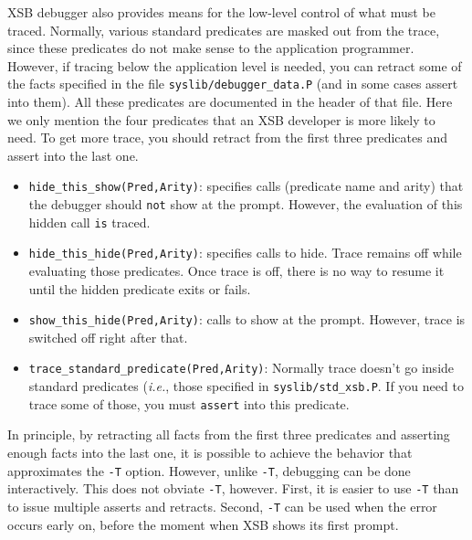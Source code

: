 XSB debugger also provides means for the low-level control of what
must be traced. Normally, various standard predicates are masked out
from the trace, since these predicates do not make sense to the
application programmer.  However, if tracing below the application
level is needed, you can retract some of the facts specified in the
file {\tt syslib/debugger\_data.P} (and in some cases assert into
them). All these predicates are documented in the header of that
file. Here we only mention the four predicates that an XSB developer
is more likely to need. To get more trace, you should retract from the
first three predicates and assert into the last one.
\begin{itemize}
\item {\tt hide\_this\_show(Pred,Arity)}: specifies calls (predicate name and
  arity) that the debugger should {\tt not} show at the prompt. However,
  the evaluation of this hidden call {\tt is} traced.
\item {\tt hide\_this\_hide(Pred,Arity)}: specifies calls to hide. Trace
  remains off while evaluating those predicates. Once trace is off, there
  is no way to resume it until the hidden predicate exits or fails.
\item  {\tt show\_this\_hide(Pred,Arity)}: calls to show at the
  prompt. However, trace is switched off right after that.
\item  {\tt trace\_standard\_predicate(Pred,Arity)}: Normally trace doesn't
  go inside standard predicates ({\it i.e.}, those specified in
  {\tt syslib/std\_xsb.P}. If you need to trace some of those, you must
  {\tt assert} into this predicate.
\end{itemize}
In principle, by retracting all facts from the first three predicates and
asserting enough facts into the last one, it is possible to achieve the
behavior that approximates the {\tt -T} option. However, unlike {\tt -T},
debugging can be done interactively. This does not obviate {\tt -T},
however. First, it is easier to use {\tt -T} than to issue multiple asserts
and retracts. Second, {\tt -T} can be used when the error occurs early on,
before the moment when XSB shows its first prompt.

\newcommand{\ctrace}{{\tt logforest}}

